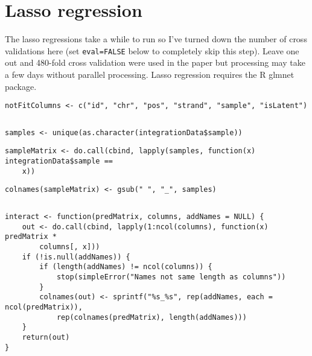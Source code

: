 \documentclass[../../sherrill-Mix_thesis.tex]{subfiles}
\makeatletter
\newenvironment{kframe}{%
 \def\at@end@of@kframe{}%
 \ifinner\ifhmode%
  \def\at@end@of@kframe{\end{minipage}}%
  \begin{minipage}{\columnwidth}%
 \fi\fi%
 \def\FrameCommand##1{\hskip\@totalleftmargin \hskip-\fboxsep
 \colorbox{shadecolor}{##1}\hskip-\fboxsep
     \hskip-\linewidth \hskip-\@totalleftmargin \hskip\columnwidth}%
 \MakeFramed {\advance\hsize-\width
   \@totalleftmargin\z@ \linewidth\hsize
   \@setminipage}}%
 {\par\unskip\endMakeFramed%
 \at@end@of@kframe}
\newenvironment{knitrout}{}{} %
\makeatother
\begin{document}
\section{Lasso regression}
The lasso regressions take a while to run so I've turned down the number of cross validations here (set \texttt{eval=FALSE} below to completely skip this step).  Leave one out and 480-fold cross validation were used in the paper but processing may take a few days without parallel processing. Lasso regression requires the R glmnet package. 
\begin{center}
\begin{knitrout}
\color{fgcolor}\begin{kframe}
\begin{lstlisting}[basicstyle=\ttfamily,breaklines=true]
notFitColumns <- c("id", "chr", "pos", "strand", "sample", "isLatent")\end{lstlisting}
\begin{lstlisting}[basicstyle=\ttfamily,breaklines=true]
\end{lstlisting}
\begin{lstlisting}[basicstyle=\ttfamily,breaklines=true]
samples <- unique(as.character(integrationData$sample))\end{lstlisting}
\begin{lstlisting}[basicstyle=\ttfamily,breaklines=true]
sampleMatrix <- do.call(cbind, lapply(samples, function(x) integrationData$sample == 
    x))\end{lstlisting}
\begin{lstlisting}[basicstyle=\ttfamily,breaklines=true]
colnames(sampleMatrix) <- gsub(" ", "_", samples)\end{lstlisting}
\begin{lstlisting}[basicstyle=\ttfamily,breaklines=true]
\end{lstlisting}
\begin{lstlisting}[basicstyle=\ttfamily,breaklines=true]
interact <- function(predMatrix, columns, addNames = NULL) {
    out <- do.call(cbind, lapply(1:ncol(columns), function(x) predMatrix * 
        columns[, x]))
    if (!is.null(addNames)) {
        if (length(addNames) != ncol(columns)) {
            stop(simpleError("Names not same length as columns"))
        }
        colnames(out) <- sprintf("%s_%s", rep(addNames, each = ncol(predMatrix)), 
            rep(colnames(predMatrix), length(addNames)))
    }
    return(out)
}\end{lstlisting}
\begin{lstlisting}[basicstyle=\ttfamily,breaklines=true]

\end{lstlisting}
\end{kframe}
\end{knitrout}
\end{center}
\end{document}
